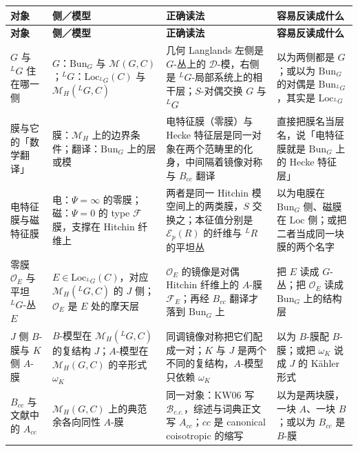 \begingroup
\footnotesize
\renewcommand{\arraystretch}{1.16}
\begin{longtable}{@{}p{3.0cm}p{2.9cm}p{4.8cm}p{3.85cm}@{}}
\toprule
\bfseries 对象 & \bfseries 侧／模型 & \bfseries 正确读法 & \bfseries 容易反读成什么 \\
\midrule
\endfirsthead
\toprule
\bfseries 对象 & \bfseries 侧／模型 & \bfseries 正确读法 & \bfseries 容易反读成什么 \\
\midrule
\endhead
\bottomrule
\endlastfoot

$G$ 与 ${}^LG$ 住在哪一侧 & $G$：$\mathrm{Bun}_G$ 与 $\mathcal M(G,C)$；${}^LG$：$\mathrm{Loc}_{{}^LG}(C)$ 与 $\mathcal M_H({}^LG,C)$ & 几何 Langlands 左侧是 $G$-丛上的 $\mathcal D$-模，右侧是 ${}^LG$-局部系统上的相干层；$S$-对偶交换 $G$ 与 ${}^LG$ & 以为两侧都是 $G$；或以为 $\mathrm{Bun}_G$ 的对偶是 $\mathrm{Bun}_{{}^LG}$，其实是 $\mathrm{Loc}_{{}^LG}$ \\
\addlinespace[3pt]
膜与它的「数学翻译」 & 膜：$\mathcal M_H$ 上的边界条件；翻译：$\mathrm{Bun}_G$ 上的层或模 & 电特征膜（零膜）与 Hecke 特征层是同一对象在两个范畴里的化身，中间隔着镜像对称与 $B_{cc}$ 翻译 & 直接把膜名当层名，说「电特征膜就是 $\mathrm{Bun}_G$ 上的 Hecke 特征层」 \\
\addlinespace[3pt]
电特征膜与磁特征膜 & 电：$\Psi=\infty$ 的零膜；磁：$\Psi=0$ 的 type $\mathcal F$ 膜，支撑在 Hitchin 纤维上 & 两者是同一 Hitchin 模空间上的两类膜，$S$ 交换之；本征值分别是 $\mathcal E_p(R)$ 的纤维与 ${}^LR$ 的平坦丛 & 以为电膜在 $\mathrm{Bun}_G$ 侧、磁膜在 $\mathrm{Loc}$ 侧；或把二者当成同一块膜的两个名字 \\
\addlinespace[3pt]
零膜 $\mathcal O_E$ 与平坦 ${}^LG$-丛 $E$ & $E\in\mathrm{Loc}_{{}^LG}(C)$，对应 $\mathcal M_H({}^LG,C)$ 的 $J$ 侧；$\mathcal O_E$ 是 $E$ 处的摩天层 & $\mathcal O_E$ 的镜像是对偶 Hitchin 纤维上的 $A$-膜 $\mathcal F_E$；再经 $B_{cc}$ 翻译才落到 $\mathrm{Bun}_G$ 上 & 把 $E$ 读成 $G$-丛；把 $\mathcal O_E$ 读成 $\mathrm{Bun}_G$ 上的结构层 \\
\addlinespace[3pt]
$J$ 侧 $B$-膜与 $K$ 侧 $A$-膜 & $B$-模型在 $\mathcal M_H({}^LG,C)$ 的复结构 $J$；$A$-模型在 $\mathcal M_H(G,C)$ 的辛形式 $\omega_K$ & 同调镜像对称把它们配成一对；$K$ 与 $J$ 是两个不同的复结构，$A$-模型只依赖 $\omega_K$ & 以为 $B$-膜配 $B$-膜；或把 $\omega_K$ 说成 $J$ 的 Kähler 形式 \\
\addlinespace[3pt]
$B_{cc}$ 与文献中的 $A_{cc}$ & $\mathcal M_H(G,C)$ 上的典范余各向同性 $A$-膜 & 同一对象：KW06 写 $\mathcal B_{c.c.}$，综述与词典正文写 $A_{cc}$；$cc$ 是 canonical coisotropic 的缩写 & 以为是两块膜，一块 $A$、一块 $B$；或以为 $B_{cc}$ 是 $B$-膜 \\

\end{longtable}
\endgroup

